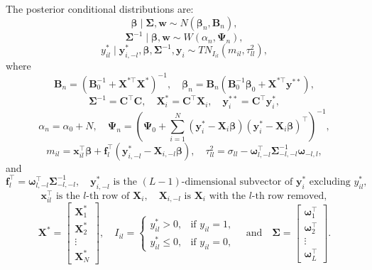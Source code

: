 The posterior conditional distributions are:
\begin{equation*}
	\bm{\beta} \mid \bm{\Sigma}, \bm{w} \sim N(\bm{\beta}_n, \bm{B}_n),
\end{equation*}
\begin{equation*}
	\bm{\Sigma}^{-1} \mid \bm{\beta}, \bm{w} \sim W(\alpha_n, \bm{\Psi}_n),
\end{equation*}
\begin{equation*}
	y_{il}^* \mid \bm{y}_{i,-l}^*, \bm{\beta}, \bm{\Sigma}^{-1}, \bm{y}_i 
	\sim TN_{I_{il}}(m_{il}, \tau_{ll}^2),
\end{equation*}
where
\[
\bm{B}_n = (\bm{B}_0^{-1} + \bm{X}^{*\top}\bm{X}^*)^{-1}, 
\quad
\bm{\beta}_n = \bm{B}_n (\bm{B}_0^{-1}\bm{\beta}_0 + \bm{X}^{*\top}\bm{y}^{**}),
\]
\[
\bm{\Sigma}^{-1} = \bm{C}^\top \bm{C}, 
\quad
\bm{X}_i^{*} = \bm{C}^\top \bm{X}_i,
\quad
\bm{y}_i^{**} = \bm{C}^\top \bm{y}_i^*,
\]
\[
\alpha_n = \alpha_0 + N, 
\quad 
\bm{\Psi}_n = \left(\bm{\Psi}_0 + \sum_{i=1}^N (\bm{y}_i^* - \bm{X}_i\bm{\beta})(\bm{y}_i^* - \bm{X}_i\bm{\beta})^\top\right)^{-1},
\]
\[
m_{il} = \bm{x}_{il}^\top \bm{\beta} + \bm{f}_l^\top(\bm{y}_{i,-l}^* - \bm{X}_{i,-l}\bm{\beta}),
\quad
\tau_{ll}^2 = \sigma_{ll} - \bm{\omega}_{l,-l}^\top \bm{\Sigma}_{-l,-l}^{-1} \bm{\omega}_{-l,l},
\]
and
\[
\bm{f}_l^\top = \bm{\omega}_{l,-l}^\top \bm{\Sigma}_{-l,-l}^{-1}, 
\quad
\bm{y}_{i,-l}^* \text{ is the } (L-1)\text{-dimensional subvector of } \bm{y}_i^* \text{ excluding } y_{il}^*,
\]
\[
\bm{x}_{il}^\top \text{ is the } l\text{-th row of } \bm{X}_i, 
\quad
\bm{X}_{i,-l} \text{ is } \bm{X}_i \text{ with the } l\text{-th row removed},
\]
\[
\bm{X}^* = 
\begin{bmatrix}
	\bm{X}_1^* \\[2pt]
	\bm{X}_2^* \\[2pt]
	\vdots \\[2pt]
	\bm{X}_N^*
\end{bmatrix},
\quad
I_{il} =
\begin{cases}
	y_{il}^* > 0, & \text{if } y_{il} = 1,\\
	y_{il}^* \leq 0, & \text{if } y_{il} = 0,
\end{cases}
\quad \text{and} \quad
\bm{\Sigma} =
\begin{bmatrix}
	\bm{\omega}_1^\top \\
	\bm{\omega}_2^\top \\
	\vdots \\
	\bm{\omega}_L^\top
\end{bmatrix}.
\]

